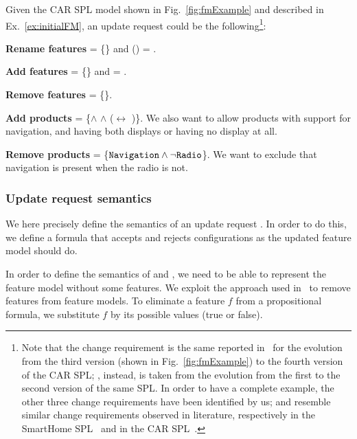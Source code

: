 \begin{tikzborder}{\cite{Gargantini16:validation}}
\begin{tikzborder}{\cite{gargantini_combinatorial_2017}}
\begin{tikzborder}{\cite{garn2019}}
\begin{tikzborder}{\cite{arcaini2019achieving}}
	\begin{exmp}\label{ex:updReq}
		Given the CAR SPL model shown in Fig.~\ref{fig:fmExample} and described in Ex.~\ref{ex:initialFM}, an update request could be the following\footnote{Note that the change requirement \Fadd is the same reported in~\cite{Pleuss2012} for the evolution from the third version (shown in Fig.~\ref{fig:fmExample}) to the fourth version of the CAR SPL; \CFrem, instead, is taken from the evolution from the first to the second version of the same SPL. In order to have a complete example, the other three change requirements have been identified by us; \Ftbr and \Frem resemble similar change requirements observed in literature, respectively in the SmartHome SPL~\cite{smartHomePaper} and in the CAR SPL~\cite{Pleuss2012}.}:
		\begin{compactitem}
			\item \textbf{Rename features} \Ftbr = \{\MonochromeRadioDisplay{}\} and \rename(\MonochromeRadioDisplay) = \RadioDisplay.
			\item \textbf{Add features} \Fadd = \{\DVDEntertainment{}\} and \parent{\DVDEntertainment} = \MultimediaDevices.
			\item \textbf{Remove features} \Frem = \{\OtherFeatures{}\}.
			\item \textbf{Add products} \CFrelax = \{\MultimediaDevices $\wedge$ \Navigation $\wedge$ (\MonochromeNavigationDisplay $\leftrightarrow$ \ColorNavigationDisplay{})\}. We also want to allow products with support for navigation, and having both displays or having no display at all. 
			\item \textbf{Remove products} \CFrem = \{${\tt Nav\-i\-ga\-tion} \wedge \neg {\tt Radio}$\}. We want to exclude that navigation is present when the radio is not.
		\end{compactitem}
	\end{exmp}
	\be
	
	\subsubsection{Update request semantics}\label{sec:target}
	
	\bb We here precisely define the semantics of an update request \UR. In order to do this, we define a formula that accepts and rejects configurations as the updated feature model should do.
	
	In order to define the semantics of \Frem and \CFrelax, we need to be able to represent the feature model without some features. We exploit the approach used in~\cite{thum_abstract_2011} to remove features from feature models. To eliminate a feature $f$ from a propositional formula, we substitute $f$ by its possible values (true or false). \be
	

\end{tikzborder}
\end{tikzborder}
\end{tikzborder}
\end{tikzborder}
